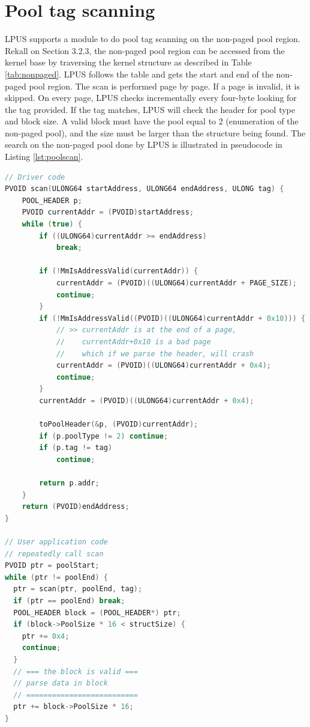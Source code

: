 \section[Pool tag scanning]{Pool tag scanning}

LPUS supports a module to do pool tag scanning on the non-paged pool region.
Rekall on Section 3.2.3, the non-paged pool region can be accessed from the
kernel base by traversing the kernel structure as described in Table
\ref{tab:nonpaged}.  LPUS follows the table and gets the start and end of the
non-paged pool region.  The scan is performed page by page. If a page is
invalid, it is skipped. On every page, LPUS checks incrementally every
four-byte looking for the tag provided. If the tag matches, LPUS will check the
header for pool type and block size. A valid block must have the pool equal to
2 (enumeration of the non-paged pool), and the size must be larger than the
structure being found.  The search on the non-paged pool done by LPUS is
illustrated in pseudocode in Listing \ref{lst:poolscan}.

\begin{lstlisting}[language=cpp,caption={Pool Scan},label={lst:poolscan},float,floatplacement=H]
// Driver code
PVOID scan(ULONG64 startAddress, ULONG64 endAddress, ULONG tag) {
    POOL_HEADER p;
    PVOID currentAddr = (PVOID)startAddress;
    while (true) {
        if ((ULONG64)currentAddr >= endAddress)
            break;

        if (!MmIsAddressValid(currentAddr)) {
            currentAddr = (PVOID)((ULONG64)currentAddr + PAGE_SIZE);
            continue;
        }
        if (!MmIsAddressValid((PVOID)((ULONG64)currentAddr + 0x10))) {
            // >> currentAddr is at the end of a page,
            //    currentAddr+0x10 is a bad page
            //    which if we parse the header, will crash
            currentAddr = (PVOID)((ULONG64)currentAddr + 0x4);
            continue;
        }
        currentAddr = (PVOID)((ULONG64)currentAddr + 0x4);

        toPoolHeader(&p, (PVOID)currentAddr);
        if (p.poolType != 2) continue;
        if (p.tag != tag)
            continue;

        return p.addr;
    }
    return (PVOID)endAddress;
}

// User application code
// repeatedly call scan
PVOID ptr = poolStart;
while (ptr != poolEnd) {
  ptr = scan(ptr, poolEnd, tag);
  if (ptr == poolEnd) break;
  POOL_HEADER block = (POOL_HEADER*) ptr;
  if (block->PoolSize * 16 < structSize) {
    ptr += 0x4;
    continue;
  }
  // === the block is valid ===
  // parse data in block
  // ==========================
  ptr += block->PoolSize * 16;
}

\end{lstlisting}

